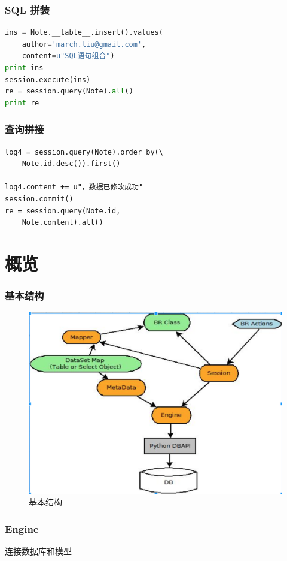 \documentclass{beamer}
\begin{document}
\begin{frame}[containsverbatim]
  \frametitle{SQL 拼装}
  \begin{lstlisting}[language=python]
ins = Note.__table__.insert().values(
    author='march.liu@gmail.com', 
    content=u"SQL语句组合")
print ins
session.execute(ins)
re = session.query(Note).all()
print re 
  \end{lstlisting}
\end{frame}


\begin{frame}[containsverbatim]
  \frametitle{查询拼接}
  \begin{lstlisting}
log4 = session.query(Note).order_by(\
    Note.id.desc()).first()

log4.content += u"，数据已修改成功"
session.commit()
re = session.query(Note.id, 
    Note.content).all()

  \end{lstlisting}
\end{frame}

\section{概览}
\begin{frame}
  \frametitle{基本结构}
  \begin{figure}
    \centering
    \includegraphics[bb=0 0 988 458,scale=.4]{struct.png}
    \caption{基本结构 }
    \label{fig:struct}
  \end{figure}
\end{frame}

\begin{frame}
  \frametitle{Engine}
  \begin{center}
    \Large{连接数据库和模型}
  \end{center}
\end{frame}
\end{document}
